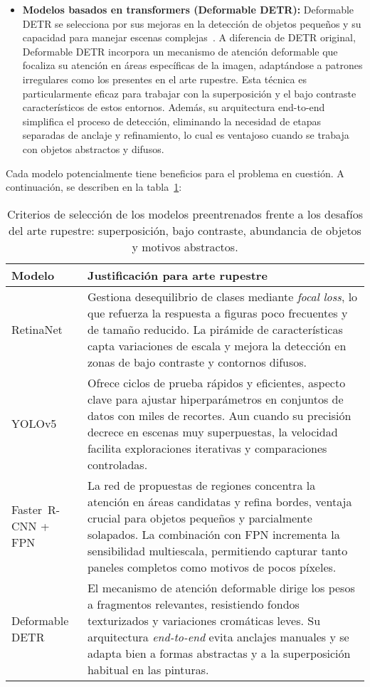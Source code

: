 \begin{itemize}
    \item \textbf{Modelos basados en transformers (Deformable DETR):}
    Deformable DETR se selecciona por sus mejoras en la detección de objetos pequeños y su capacidad para manejar escenas complejas~\cite{zhu2021}.
    A diferencia de DETR original, Deformable DETR incorpora un mecanismo de atención deformable que focaliza su atención en áreas específicas de la imagen, adaptándose a patrones irregulares como los presentes en el arte rupestre.
    Esta técnica es particularmente eficaz para trabajar con la superposición y el bajo contraste característicos de estos entornos.
    Además, su arquitectura end-to-end simplifica el proceso de detección, eliminando la necesidad de etapas separadas de anclaje y refinamiento, lo cual es ventajoso cuando se trabaja con objetos abstractos y difusos.
\end{itemize}

Cada modelo potencialmente tiene beneficios para el problema en cuestión. A continuación, se describen en la tabla~\ref{tab:justificacion_modelos}:

\begin{table}[h]
    \centering
    \begin{tabular}{p{3.5cm} p{10.8cm}}
        \hline
        \textbf{Modelo} & \textbf{Justificación para arte rupestre} \\
        \hline
        RetinaNet & Gestiona desequilibrio de clases mediante \emph{focal loss}, lo que refuerza la respuesta a figuras poco frecuentes y de tamaño reducido.
        La pirámide de características capta variaciones de escala y mejora la detección en zonas de bajo contraste y contornos difusos. \\[0.4em]
        YOLOv5 & Ofrece ciclos de prueba rápidos y eficientes, aspecto clave para ajustar hiperparámetros en conjuntos de datos con miles de recortes.
        Aun cuando su precisión decrece en escenas muy superpuestas, la velocidad facilita exploraciones iterativas y comparaciones controladas. \\[0.4em]
        Faster~R-CNN + FPN & La red de propuestas de regiones concentra la atención en áreas candidatas y refina bordes, ventaja crucial para objetos pequeños y parcialmente solapados.
        La combinación con FPN incrementa la sensibilidad multiescala, permitiendo capturar tanto paneles completos como motivos de pocos píxeles. \\[0.4em]
        Deformable DETR & El mecanismo de atención deformable dirige los pesos a fragmentos relevantes, resistiendo fondos texturizados y variaciones cromáticas leves.
        Su arquitectura \emph{end-to-end} evita anclajes manuales y se adapta bien a formas abstractas y a la superposición habitual en las pinturas. \\
    \end{tabular}
    \caption{Criterios de selección de los modelos preentrenados frente a los desafíos del arte rupestre: superposición, bajo contraste, abundancia de objetos y motivos abstractos.}
    \label{tab:justificacion_modelos}
\end{table}

